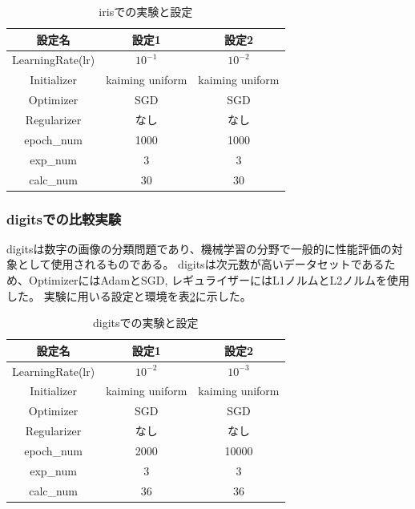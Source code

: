 \begin{table}[htbp]
\label{exp:iris}
    \begin{center}
        \caption{irisでの実験と設定}
        \label{exp:iris}
        \vspace{2mm} 
        \begin{tabular}{ |c|c|c| }
        設定名 & 設定1 & 設定2 \\
        \hline
        LearningRate(lr)         & $ 10^{-1} $ & $ 10^{-2} $ \\
        Initializer       & kaiming uniform &  kaiming uniform \\
        Optimizer           & SGD & SGD \\
        Regularizer     & なし & なし \\
        epoch\_num       & 1000 &  1000 \\
        exp\_num         & 3 & 3 \\
        calc\_num        & 30 & 30 \\
        \end{tabular}
    \end{center}
\end{table}



\subsubsection{digitsでの比較実験}
\label{impl:digits}

digitsは数字の画像の分類問題であり、機械学習の分野で一般的に性能評価の対象として使用されるものである。
digitsは次元数が高いデータセットであるため、OptimizerにはAdamとSGD, レギュライザーにはL1ノルムとL2ノルムを使用した。
実験に用いる設定と環境を表\ref{exp:digits}に示した。

\begin{table}[htbp]
    \begin{center}
        \caption{digitsでの実験と設定}
        \label{exp:digits}
        \vspace{2mm} 
        \begin{tabular}{ |c|c|c| }
        設定名 & 設定1 & 設定2 \\
        \hline
        LearningRate(lr)         & $ 10^{-2} $ & $ 10^{-3} $ \\
        Initializer       & kaiming uniform &  kaiming uniform \\
        Optimizer           & SGD & SGD \\
        Regularizer     & なし & なし \\
        epoch\_num       & 2000 &  10000 \\
        exp\_num         & 3 & 3 \\
        calc\_num        & 36 & 36 \\
        \end{tabular}
    \end{center}
\end{table}



